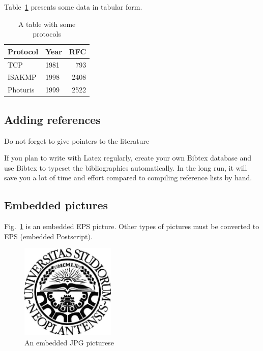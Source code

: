 \documentclass[a4paper,12pt]{article}
\begin{document}
Table~\ref{tab:mytable1} presents some data in tabular form. 

\begin{table}[t]
  \begin{center}
    \begin{tabular}{|l|lr|}
    \hline
    Protocol & Year &  RFC \\
    \hline
    TCP      & 1981 &  793 \\
    ISAKMP   & 1998 & 2408 \\
    Photuris & 1999 & 2522 \\
    \hline
    \end{tabular}
    \caption{A table with some protocols}
    \label{tab:mytable1}
  \end{center}
\end{table}




\subsection{Adding references}\label{sec:references}

Do not forget to give pointers to the literature \cite{opengl_kronos}

If you plan to write with Latex regularly, create your own Bibtex
database and use Bibtex to typeset the bibliographies automatically.
In the long run, it will save you a lot of time and effort compared to
compiling reference lists by hand.




\subsection{Embedded pictures}\label{sec:pictures}

Fig.~\ref{fig:mypicture1} is an embedded EPS picture. Other types of pictures must be converted to EPS (embedded Postscript).

\begin{figure}[t]
  \begin{center}
    \includegraphics[width=0.4\textwidth,height=0.4\textheight,keepaspectratio]{NoviSadLogoGray.jpg}
    \caption{An embedded JPG picturese }
    \label{fig:mypicture1}
  \end{center}
\end{figure}
\end{document}
